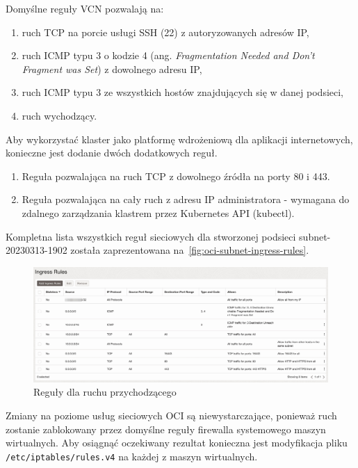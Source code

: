 \noindent Domyślne reguły VCN\cite{oci-security-lists} pozwalają na:
\begin{enumerate}
    \item ruch TCP na porcie usługi SSH (22) z autoryzowanych adresów IP\@,
    \item ruch ICMP typu 3 o kodzie 4 (ang. \emph{Fragmentation Needed and Don't Fragment was Set}) z dowolnego adresu IP,
    \item ruch ICMP typu 3 ze wszystkich hostów znajdujących się w danej podsieci,
    \item ruch wychodzący.
\end{enumerate}

\noindent Aby wykorzystać klaster jako platformę wdrożeniową dla aplikacji internetowych, konieczne jest dodanie dwóch dodatkowych reguł.

\begin{enumerate}
    \item Reguła pozwalająca na ruch TCP z dowolnego źródła na porty 80 i 443.
    \item Reguła pozwalająca na cały ruch z adresu IP administratora - wymagana do zdalnego zarządzania klastrem przez Kubernetes API (kubectl).
\end{enumerate}

\noindent Kompletna lista wszystkich reguł sieciowych dla stworzonej podsieci subnet-20230313-1902 została zaprezentowana na~\autoref{fig:oci-subnet-ingress-rules}.

\begin{figure}[H]
    \centering
    \includegraphics[width=\textwidth]{img/oci-subnet-ingress-rules}
    \caption{Reguły dla ruchu przychodzącego}
    \label{fig:oci-subnet-ingress-rules}
\end{figure}

Zmiany na poziome usług sieciowych OCI są niewystarczające, ponieważ ruch zostanie zablokowany przez domyślne reguły firewalla systemowego maszyn wirtualnych.
Aby osiągnąć oczekiwany rezultat konieczna jest modyfikacja pliku \texttt{/etc/iptables/rules.v4} na każdej z maszyn wirtualnych.

